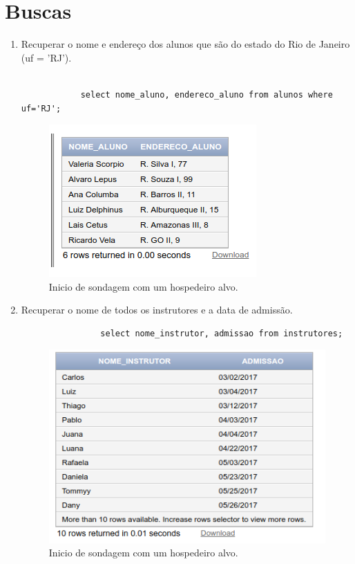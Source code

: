 \documentclass[
article,			%
11pt,				%
oneside,			%
a4paper,			%
english,			%
brazil,				%
sumario=tradicional
]{abntex2}
\begin{document}
		
	\section{Buscas}
	 
	 \begin{enumerate}
	 	\item  Recuperar o nome e endereço dos alunos que
	 	são do estado do Rio de Janeiro (uf = 'RJ').
	 	\begin{verbatim}
	 		
	 		select nome_aluno, endereco_aluno from alunos where uf='RJ';
	 	\end{verbatim}
	 		\begin{center}
	 		\begin{figure}[H]
	 			\centering
	 			\includegraphics[scale=0.5]{./at-06.png}
	 			\caption{Inicio de sondagem com um hospedeiro alvo.}
	 			\label{rota-1}
	 		\end{figure}
	 	\end{center}
	 	
	 	\item  Recuperar o nome de todos os instrutores e a
	 	data de admissão.
	 	\begin{verbatim}
		     	select nome_instrutor, admissao from instrutores;
	 	\end{verbatim}
	 	\begin{center}
	 		\begin{figure}[H]
	 			\centering
	 			\includegraphics[scale=0.5]{./at-07.png}
	 			\caption{Inicio de sondagem com um hospedeiro alvo.}
	 			\label{rota-1}
	 		\end{figure}
	 	\end{center}
	 	

\end{enumerate}
\end{document}
